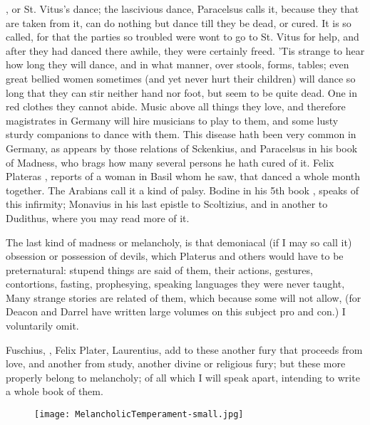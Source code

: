 , or St. Vitus's dance; the lascivious dance,
Paracelsus calls it, because they that are taken from it,
can do nothing but dance till they be dead, or cured. It is so called, for that
the parties so troubled were wont to go to St. Vitus for help, and after they
had danced there awhile, they were certainly freed. 'Tis
strange to hear how long they will dance, and in what manner, over stools,
forms, tables; even great bellied women sometimes (and yet never hurt their
children) will dance so long that they can stir neither hand nor foot, but seem
to be quite dead. One in red clothes they cannot abide. Music above all things
they love, and therefore magistrates in Germany will hire musicians to play to
them, and some lusty sturdy companions to dance with them. This disease hath
been very common in Germany, as appears by those relations of
Sckenkius, and Paracelsus in his book of Madness, who brags
how many several persons he hath cured of it. Felix Plateras
, reports of a woman in Basil
whom he saw, that danced a whole month together. The Arabians call it a kind of
palsy. Bodine in his 5th book , speaks
of this infirmity; Monavius in his last epistle to Scoltizius, and in another
to Dudithus, where you may read more of it.

The last kind of madness or melancholy, is that demoniacal (if I may so call
it) obsession or possession of devils, which Platerus and others would have to
be preternatural: stupend things are said of them, their actions, gestures,
contortions, fasting, prophesying, speaking languages they were never taught,
\etc{} Many strange stories are related of them, which because some will not
allow, (for Deacon and Darrel have written large volumes on this subject pro
and con.) I voluntarily omit.

Fuschius, , Felix Plater, Laurentius, add to these another
fury that proceeds from love, and another from study, another divine or
religious fury; but these more properly belong to melancholy; of all which I
will speak apart, intending to write a whole book of them.

\cleartoleftpage{}
\begin{figure}[p]
  \begingroup
  \centering
  \texttt{[image: MelancholicTemperament-small.jpg]}
  \label{fig:melancholictemperament}
\end{figure}

